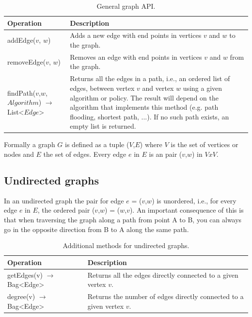 \begin{table}[H]
	\caption{General graph API.}
	\label{tab:api:graph}
	\begin{tabular}{p{150px} | p{250px}}
		\textbf{Operation} & \textbf{Description} \\
		\hline
		addEdge($v$, $w$) & Adds a new edge with end points in vertices $v$ and $w$ to the graph. \\
		removeEdge($v$, $w$) & Removes an edge with end points in vertices $v$ and $w$ from the graph. \\
		findPath($v$,$w$,$Algorithm$)  $\rightarrow$ List<$Edge$> & Returns all the edges in a path, i.e., an ordered list of edges, between vertex $v$ and vertex $w$ using a given algorithm or policy. The result will depend on the algorithm that implements this method (e.g. path flooding, shortest path, ...). If no such path exists, an empty list is returned. \\
		\hline
	\end{tabular}
\end{table}

Formally a graph $G$ is defined as a tuple ($V$,$E$) where $V$ is the set of vertices or nodes and $E$ the set of edges. Every edge $e$ in $E$ is an pair ($v$,$w$) in $V x V$.


\subsection{Undirected graphs}

In an undirected graph the pair for edge $e$ = ($v$,$w$) is unordered, i.e., for every edge $e$ in $E$, the ordered pair ($v$,$w$) = ($w$,$v$). An important consequence of this is that when traversing the graph along a path from point A to B, you can always go in the opposite direction from B to A along the same path.

\begin{table}[H]
	\caption{Additional methods for undirected graphs.}
	\label{tab:api:graph-undirected}
	\begin{tabular}{p{150px} | p{250px}}
		\textbf{Operation} & \textbf{Description} \\
		\hline
		getEdges(v) $\rightarrow$ Bag<Edge> & Returns all the edges directly connected to a given vertex $v$. \\
		degree(v) $\rightarrow$ Bag<Edge> & Returns the number of edges directly connected to a given vertex $v$. \\
		\hline
	\end{tabular}
\end{table}



